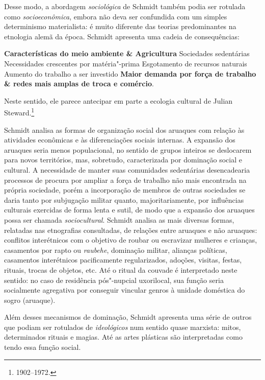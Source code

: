 Desse modo, a abordagem \textit{sociológica} de Schmidt também podia ser
rotulada como \textit{socioeconômica}, embora não deva ser confundida com um
simples determinismo materialista: é muito diferente das teorias
predominantes na etnologia alemã da época. Schmidt apresenta uma cadeia
de consequências: 
\medskip

\textbf{Características do meio ambiente \& Agricultura} \rightarrow{} Sociedades sedentárias \rightarrow{} Necessidades crescentes por matéria"-prima \rightarrow{} Esgotamento de recursos naturais \rightarrow{} Aumento do trabalho a ser investido \rightarrow{} \textbf{Maior demanda por força de trabalho \& redes mais amplas
de troca e comércio}.

\medskip
Neste sentido, ele parece antecipar em parte a
ecologia cultural de Julian Steward.\footnote{1902--1972.}

Schmidt analisa as formas de organização social dos aruaques com
relação às atividades econômicas e às diferenciações sociais internas. A
expansão dos aruaques seria menos populacional, no sentido de grupos
inteiros se deslocarem para novos territórios, mas, sobretudo,
caracterizada por dominação social e cultural. A necessidade de manter
suas comunidades sedentárias desencadearia processos de procura por
ampliar a força de trabalho não mais encontrada na própria sociedade,
porém a incorporação de membros de outras sociedades se daria tanto por
subjugação militar quanto, majoritariamente, por influências culturais
exercidas de forma lenta e sutil, de modo que a expansão dos aruaques
possa ser chamada \textit{sociocultural}. Schmidt analisa as mais diversas
formas, relatadas nas etnografias consultadas, de relações entre
aruaques e não aruaques: conflitos interétnicos com o objetivo de roubar
ou escravizar mulheres e crianças, casamentos por rapto ou \textit{raubehe}, dominação militar, alianças políticas, casamentos
interétnicos pacificamente regularizados, adoções, visitas, festas,
rituais, trocas de objetos, etc. Até o ritual da couvade é interpretado
neste sentido: no caso de residência pós"-nupcial uxorilocal, sua função
seria socialmente agregativa por conseguir vincular genros à unidade
doméstica do sogro (aruaque).

Além desses mecanismos de dominação, Schmidt apresenta uma série de
outros que podiam ser rotulados de \textit{ideológicos} num sentido quase
marxista: mitos, determinados rituais e magias. Até as artes plásticas
são interpretadas como tendo essa função social.

